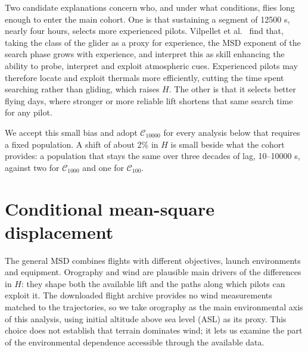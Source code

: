Two candidate explanations concern who, and under what conditions, flies long
enough to enter the main cohort. One is that sustaining a segment of 12500 s,
nearly four hours, selects more experienced pilots. Vilpellet et al.~\cite{vilpellet2026} find that,
taking the class of the glider as a proxy for experience, the MSD exponent of the
search phase grows with experience, and interpret this as skill enhancing the
ability to probe, interpret and exploit atmospheric cues. Experienced pilots may
therefore locate and exploit thermals more efficiently, cutting the time spent
searching rather than gliding, which raises $H$. The other is that it
selects better flying days, where stronger or more reliable lift shortens that same
search time for any pilot.

We accept this small bias and adopt $\mathcal C_{10000}$ for every analysis below that
requires a fixed population. A shift of about 2\% in $H$ is small beside what the cohort
provides: a population that stays the same over three decades of lag, 10--10000 s,
against two for $\mathcal C_{1000}$ and one for $\mathcal C_{100}$.



\section{Conditional mean-square displacement}
\label{sec:fixed-circuit}

The general MSD combines flights with different objectives, launch environments
and equipment. Orography and wind are plausible main drivers of the differences
in $H$: they shape both the available lift and the paths along which pilots can
exploit it. The downloaded flight archive provides no wind measurements matched
to the trajectories, so we take orography as the main environmental axis of this
analysis, using initial altitude above sea level (ASL) as its proxy. This choice
does not establish that terrain dominates wind; it lets us examine the part of
the environmental dependence accessible through the available data.

